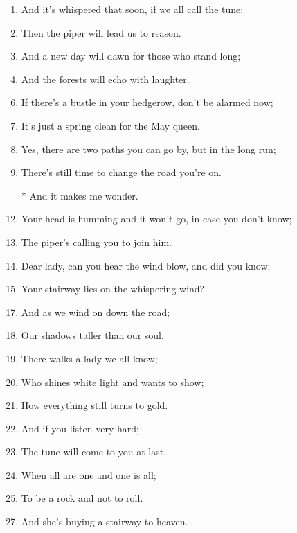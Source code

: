 \documentclass{article}
\begin{document}
\begin{center}
\begin{enumerate}
            \item And it's whispered that soon, if we all call the tune;
            \item Then the piper will lead us to reason.
            \item And a new day will dawn for those who stand long;
            \item And the forests will echo with laughter.

            \item[]

            \item If there's a bustle in your hedgerow, don't be alarmed now;
            \item It's just a spring clean for the May queen.
            \item Yes, there are two paths you can go by, but in the long run;
            \item There's still time to change the road you're on.

            \item[]
            \item[*] And it makes me wonder.
            \pagebreak

            \item Your head is humming and it won't go, in case you don't know;
            \item The piper's calling you to join him.
            \item Dear lady, can you hear the wind blow, and did you know;
            \item Your stairway lies on the whispering wind?

            \item[]

            \item And as we wind on down the road;
            \item Our shadows taller than our soul.
            \item There walks a lady we all know;
            \item Who shines white light and wants to show;
            \item How everything still turns to gold.
            \item And if you listen very hard;
            \item The tune will come to you at last.
            \item When all are one and one is all;
            \item To be a rock and not to roll.

            \item[]

            \item And she's buying a stairway to heaven.

        \end{enumerate} 
    \end{center}
\end{document}
